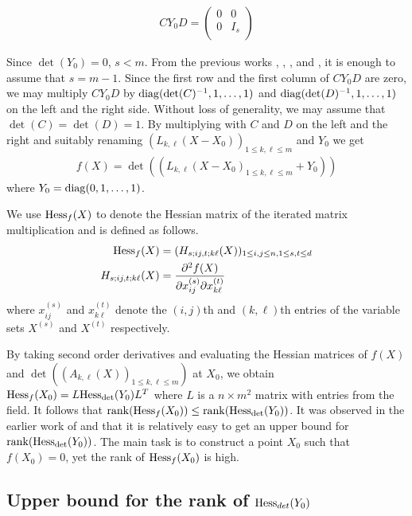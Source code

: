 \begin{align*}
  CY_0D =
  \begin{pmatrix}
    0& 0\\
    0& I_s\\
  \end{pmatrix}
\end{align*}

Since $\det(Y_0)=0$, $s<m$. From the previous works \cite{von1987}, \cite{cai1990}, \cite{mr04}, and \cite{ccl2008}, it is enough to assume that $s=m-1$. Since the first row and the first column of $CY_0D$ are zero, we may multiply $CY_0D$ by $\mathrm{diag}(\det(C)^{-1},1,\dots,1)$ and $\mathrm{diag}(\det(D)^{-1},1,\dots,1)$ on the left and the right side. Without loss of generality, we may assume that $\det(C)=\det(D)=1$. By multiplying with $C$ and $D$ on the left and the right and suitably renaming $(L_{k,\ell}(X-X_0))_{1\leq k,\ell\leq m}$ and $Y_0$ we get
\begin{align*}
  f(X) = \det((L_{k,\ell}(X-X_0)_{1\leq k,\ell\leq m} + Y_0))
\end{align*}
where $Y_0 = \mathrm{diag}(0,1,\dots,1)$. 

We use $\mathrm{Hess}_{f}(X)$ to denote the Hessian matrix of the iterated matrix multiplication and is defined as follows.
\begin{align*}
  \mathrm{Hess}_{f}(X) &= (H_{s;ij,t;k\ell}(X))_{1\leq i,j\leq n, 1\leq s,t \leq d }\\
  H_{s;ij,t;k\ell}(X) &= \frac{\partial^2f(X)}{\partial x_{ij}^{(s)}\partial x_{k\ell}^{(t)}}
\end{align*}
where $x_{ij}^{(s)}$ and $x_{k\ell}^{(t)}$  denote the $(i,j)$th and $(k,\ell)$th entries of the variable sets $X^{(s)}$ and $X^{(t)}$ respectively. 

By taking second order derivatives and evaluating the Hessian matrices of $f(X)$ and $\det((A_{k,\ell}(X))_{1\leq k,\ell\leq m})$ at $X_0$, we obtain $\mathrm{Hess}_{f}(X_0) = L\mathrm{Hess}_{\det}(Y_0)L^{T}$ where $L$ is a $n\times m^2$ matrix with entries from the field. It follows that $\mathrm{rank}(\mathrm{Hess}_{f}(X_0)) \leq \mathrm{rank}(\mathrm{Hess}_{\det}(Y_0))$. It was observed in the earlier work  of \cite{mr04} and \cite{ccl2008} that it is relatively easy to get an upper bound for $\mathrm{rank}(\mathrm{Hess}_{\det}(Y_0))$. 
The main task is to construct a point $X_0$ such that $f(X_0)=0$, yet the rank of $\mathrm{Hess}_{f}(X_0)$ is high. 

\subsection{Upper bound for the rank of $\mathrm{Hess}_{det}(Y_0)$}


